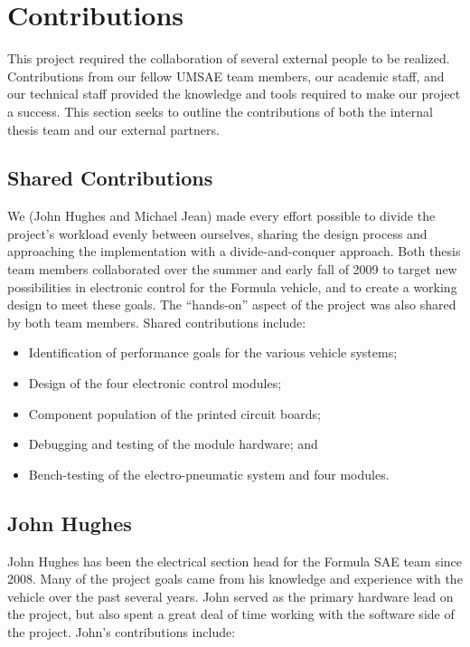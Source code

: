 \chapter*{Contributions}

This project required the collaboration of several external people to be realized. Contributions from our fellow UMSAE team members, our academic staff, and our technical staff provided the knowledge and tools required to make our project a success. This section seeks to outline the contributions of both the internal thesis team and our external partners. 

\section*{Shared Contributions}

We (John Hughes and Michael Jean) made every effort possible to divide the project's workload evenly between ourselves, sharing the design process and approaching the implementation with a divide-and-conquer approach. Both thesis team members collaborated over the summer and early fall of 2009 to target new possibilities in electronic control for the Formula vehicle, and to create a working design to meet these goals. The {}``hands-on'' aspect of the project was also shared by both team members. Shared contributions include:

\begin{itemize}

\item Identification of performance goals for the various vehicle systems;
\item Design of the four electronic control modules;
\item Component population of the printed circuit boards;
\item Debugging and testing of the module hardware; and
\item Bench-testing of the electro-pneumatic system and four modules.

\end{itemize}

\section*{John Hughes}

John Hughes has been the electrical section head for the Formula SAE team since 2008. Many of the project goals came from his knowledge and experience with the vehicle over the past several years. John served as the primary hardware lead on the project, but also spent a great deal of time working with the software side of the project. John's contributions include:

